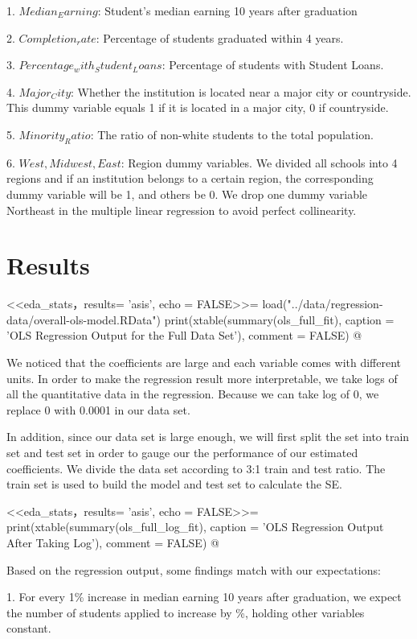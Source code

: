 \documentclass{article}
\begin{document}
1. $Median_Earning$: Student's median earning 10 years after graduation

2. $Completion_rate$: Percentage of students graduated within 4 years.

3. $Percentage_with_Student_Loans$: Percentage of students with Student Loans.

4. $Major_City$: Whether the institution is located near a major city or countryside. This dummy variable equals 1 if it is located in a major city, 0 if countryside.

5. $Minority_Ratio$: The ratio of non-white students to the total population.

6. $West, Midwest, East$: Region dummy variables. We divided all schools into 4 regions and if an institution belongs to a certain region, the corresponding dummy variable will be 1, and others be 0. We drop one dummy variable Northeast in the multiple linear regression to avoid perfect collinearity.\section{Results}

<<eda_stats，results= 'asis', echo = FALSE>>=
load("../data/regression-data/overall-ols-model.RData")
print(xtable(summary(ols_full_fit), caption = 'OLS Regression Output for the Full Data Set'), comment = FALSE)
@
  
We noticed that the coefficients are large and each variable comes with different units. In order to make the regression result more interpretable, we take logs of all the quantitative data in the regression. Because we can take log of 0, we replace 0 with 0.0001 in our data set.

In addition, since our data set is large enough, we will first split the set into train set and test set in order to gauge our the performance of our estimated coefficients. We divide the data set according to 3:1 train and test ratio. The train set is used to build the model and test set to calculate the SE.

<<eda_stats，results= 'asis', echo = FALSE>>=
print(xtable(summary(ols_full_log_fit), caption = 'OLS Regression Output After Taking Log'), comment = FALSE)
@

Based on the regression output, some findings match with our expectations:

1. For every 1\% increase in median earning 10 years after graduation, we expect the number of students applied to  increase by \%, holding other variables constant.
\end{document}
